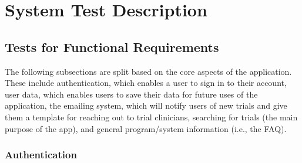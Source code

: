 \documentclass[12pt, titlepage]{article}
\begin{document}
\section{System Test Description}
	
\subsection{Tests for Functional Requirements}

The following subsections are split based on the core aspects of the application. These include authentication, which enables a user 
to sign in to their account, user data, which enables users to save their data for future uses of the application, the emailing system, which will
notify users of new trials and give them a template for reaching out to trial clinicians, searching for trials (the main purpose of the app), and 
general program/system information (i.e., the FAQ).

\subsubsection{Authentication}
\end{document}
